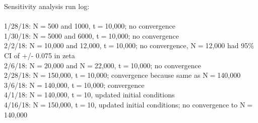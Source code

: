 \documentclass[12pt]{article}
\begin{document}
Sensitivity analysis run log: \\ \\
1/28/18: N$=$500 and 1000, t$=$10,000; no convergence \\
1/30/18: N$=$5000 and 6000, t$=$10,000; no convergence \\
2/2/18: N$=$10,000 and 12,000, t$=$10,000; no convergence, N$=$12,000 had 95\% CI of +/- 0.075 in zeta \\
2/6/18: N$=$20,000 and N$=$22,000, t$=$10,000; no convergence \\
2/28/18: N$=$150,000, t$=$10,000; convergence because same as N$=$140,000 \\
3/6/18: N$=$140,000, t$=$10,000; convergence \\
4/1/18: N$=$140,000, t$=$10, updated initial conditions \\
4/16/18: N$=$150,000, t$=$10, updated initial conditions; no convergence to N$=$140,000 \\
\end{document}
